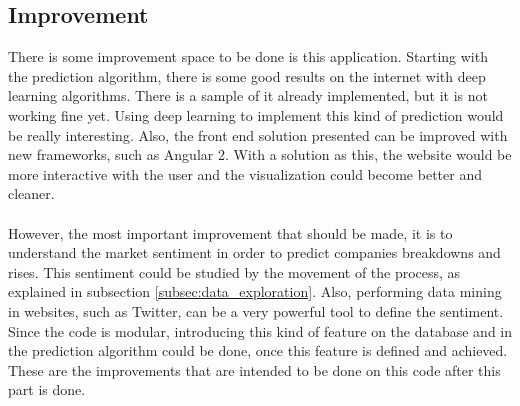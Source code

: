 \subsection{Improvement}
There is some improvement space to be done is this application. Starting with the prediction algorithm, there is some good results on the internet with deep learning algorithms. There is a sample
of it already implemented, but it is not working fine yet. Using deep learning to implement this kind of prediction would be really interesting. Also, the front end solution presented can be
improved with new frameworks, such as Angular 2. With a solution as this, the website would be more interactive with the user and the visualization could become better and cleaner.\\
\\
However, the most important improvement that should be made, it is to understand the market sentiment in order to predict companies breakdowns and rises. This sentiment could be studied by the movement
of the process, as explained in subsection \ref{subsec:data_exploration}. Also, performing data mining in websites, such as Twitter, can be a very powerful tool to define the sentiment. Since the 
code is modular, introducing this kind of feature on the database and in the prediction algorithm could be done, once this feature is defined and achieved. These are the improvements that are intended
to be done on this code after this part is done.